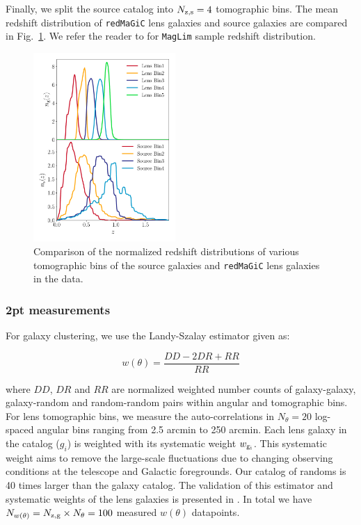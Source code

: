 \documentclass[aps, prd,twocolumn,superscriptaddress,nofootinbib,preprintnumbers]{revtex4-1}
\newcommand{\gammat}{\ensuremath{\gamma_{\rm t}(\theta)}}
\newcommand{\wtheta}{\ensuremath{w(\theta)}}
\newcommand{\redmagic}{\texttt{redMaGiC} }
\newcommand{\maglim}{\texttt{MagLim} }
\newcommand{\blue}[1]{\textcolor{blue}{#1}}
\begin{document}
Finally, we split the source catalog into $N_{\rm z,s} = 4$ tomographic bins. The mean redshift distribution of \redmagic lens galaxies and source galaxies are compared in Fig.~\ref{fig:nz_comp}. We refer the reader to \citet*{y3-2x2ptaltlensresults} for \maglim sample redshift distribution. 
\begin{figure}
\includegraphics[width=0.48\textwidth]{figs/nz_DES.pdf}
\caption[]{Comparison of the normalized redshift distributions of various tomographic bins of the source galaxies and \redmagic lens galaxies in the data.}
\label{fig:nz_comp}
\end{figure}

\subsubsection{2pt measurements}\label{sec:2pt_data}

For galaxy clustering, we use the Landy-Szalay estimator \citep{Landy_Szalay} given as:
\begin{linenomath*}
\begin{equation}
    w(\theta) = \frac{DD - 2DR + RR}{RR}
\end{equation}
\end{linenomath*}
where $DD$, $DR$ and $RR$ are normalized weighted number counts of galaxy-galaxy, galaxy-random and random-random pairs within angular and tomographic bins. For lens tomographic bins, we measure the auto-correlations in $N_{\theta} = 20$ log-spaced angular bins ranging from 2.5 arcmin to 250 arcmin. Each lens galaxy in the catalog ($g_i$) is weighted with its systematic weight $w_{\rm g_i}$. This systematic weight aims to remove the 
large-scale fluctuations due to changing observing conditions at the telescope and Galactic foregrounds. Our catalog of randoms is 40 times larger than the galaxy catalog. The validation of this estimator and systematic weights of the lens galaxies is presented in \cite{y3-galaxyclustering}. In total we have $N_{\wtheta} = N_{\rm z,g} \times N_{\theta} = 100$ measured $\wtheta$ datapoints. 
\end{document}
